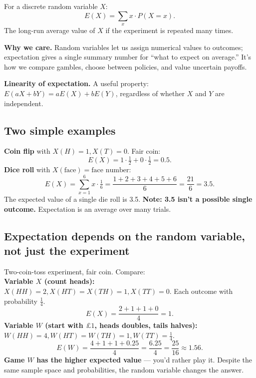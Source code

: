\documentclass[11pt, a4paper]{article}
\begin{document}
\begin{defbox}
For a discrete random variable $X$:
\[
E(X) = \sum_x x \cdot P(X = x).
\]
The long-run average value of $X$ if the experiment is repeated many times.
\end{defbox}

\textbf{Why we care.} Random variables let us assign numerical values to outcomes; expectation gives a single summary number for ``what to expect on average.'' It's how we compare gambles, choose between policies, and value uncertain payoffs.

\textbf{Linearity of expectation.} A useful property: $E(aX + bY) = a E(X) + b E(Y)$, regardless of whether $X$ and $Y$ are independent.

\subsection{Two simple examples}

\begin{exbox}
\textbf{Coin flip} with $X(H) = 1, X(T) = 0$. Fair coin:
\[
E(X) = 1 \cdot \tfrac{1}{2} + 0 \cdot \tfrac{1}{2} = 0.5.
\]
\textbf{Dice roll} with $X(\text{face}) = \text{face number}$:
\[
E(X) = \sum_{x = 1}^{6} x \cdot \tfrac{1}{6} = \frac{1 + 2 + 3 + 4 + 5 + 6}{6} = \frac{21}{6} = 3.5.
\]
The expected value of a single die roll is 3.5. \textbf{Note: 3.5 isn't a possible single outcome.} Expectation is an average over many trials.
\end{exbox}

\subsection{Expectation depends on the random variable, not just the experiment}

\begin{exbox}
Two-coin-toss experiment, fair coin. Compare:\\[0.3em]
\textbf{Variable $X$ (count heads):} $X(HH) = 2, X(HT) = X(TH) = 1, X(TT) = 0$. Each outcome with probability $\frac{1}{4}$.
\[
E(X) = \frac{2 + 1 + 1 + 0}{4} = 1.
\]
\textbf{Variable $W$ (start with $\pounds 1$, heads doubles, tails halves):} $W(HH) = 4, W(HT) = W(TH) = 1, W(TT) = \frac{1}{4}$.
\[
E(W) = \frac{4 + 1 + 1 + 0.25}{4} = \frac{6.25}{4} = \frac{25}{16} \approx 1.56.
\]
\textbf{Game $W$ has the higher expected value} — you'd rather play it. Despite the same sample space and probabilities, the random variable changes the answer.
\end{exbox}
\end{document}
